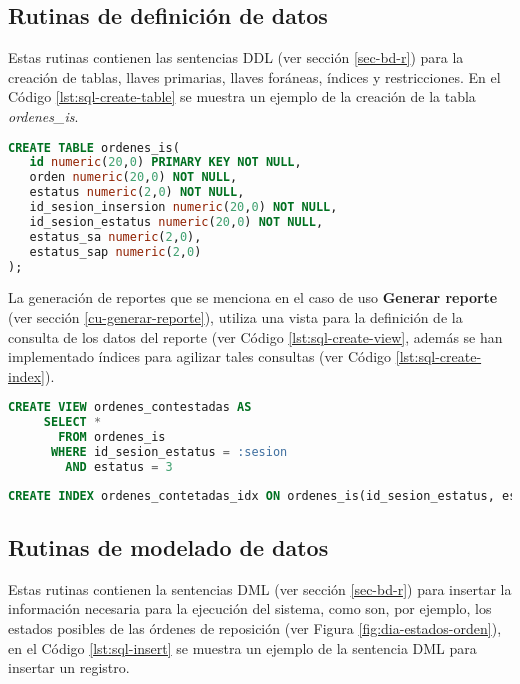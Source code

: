 \subsection{Rutinas de definición de datos}
Estas rutinas contienen las sentencias DDL (ver sección \ref{sec-bd-r}) para la creación de tablas, llaves primarias, llaves foráneas, índices y restricciones. En el Código \ref{lst:sql-create-table} se muestra un ejemplo de la creación de la tabla \textit{ordenes\_is}.
\begin{lstlisting}[language=SQL, caption={Sentencia para crear una tabla.}, captionpos=b, label={lst:sql-create-table}]
CREATE TABLE ordenes_is(
   id numeric(20,0) PRIMARY KEY NOT NULL,
   orden numeric(20,0) NOT NULL,
   estatus numeric(2,0) NOT NULL,
   id_sesion_insersion numeric(20,0) NOT NULL,
   id_sesion_estatus numeric(20,0) NOT NULL,
   estatus_sa numeric(2,0),
   estatus_sap numeric(2,0)
);
\end{lstlisting}

La generación de reportes que se menciona en el caso de uso \textbf{Generar reporte} (ver sección \ref{cu-generar-reporte}), utiliza una vista para la definición de la consulta de los datos del reporte (ver Código \ref{lst:sql-create-view}, además se han implementado índices para agilizar tales consultas (ver Código \ref{lst:sql-create-index}).

\begin{lstlisting}[language=SQL, caption={Sentencia para crear una vista.}, captionpos=b, label={lst:sql-create-view}]
CREATE VIEW ordenes_contestadas AS
     SELECT *
       FROM ordenes_is
      WHERE id_sesion_estatus = :sesion
        AND estatus = 3
\end{lstlisting}

\begin{lstlisting}[language=SQL, caption={Sentencia para crear un índice.}, captionpos=b, label={lst:sql-create-index}]
CREATE INDEX ordenes_contetadas_idx ON ordenes_is(id_sesion_estatus, estatus);
\end{lstlisting}

\subsection{Rutinas de modelado de datos}
Estas rutinas contienen la sentencias DML (ver sección \ref{sec-bd-r}) para insertar la información necesaria para la ejecución del sistema, como son, por ejemplo, los estados posibles de las órdenes de reposición (ver Figura \ref{fig:dia-estados-orden}), en el Código \ref{lst:sql-insert} se muestra un ejemplo de la sentencia DML para insertar un registro.

